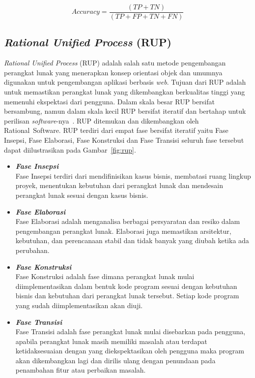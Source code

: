 \begin{itemize}
      \begin{equation}\label{eq:Accuracy}
            Accuracy = \frac{(TP + TN)}{(TP + FP + TN + FN)}
      \end{equation}

\end{itemize}

\subsection{\emph{Rational Unified Process} (RUP)}
\emph{Rational Unified Process} (RUP) adalah salah satu metode pengembangan perangkat lunak yang
menerapkan konsep orientasi objek dan umumnya digunakan untuk pengembangan aplikasi
berbasis \emph{web}. Tujuan dari RUP adalah untuk memastikan perangkat lunak yang dikembangkan
berkualitas tinggi yang memenuhi ekspektasi dari pengguna. Dalam skala besar RUP bersifat bersambung,
namun dalam skala kecil RUP bersifat iteratif dan bertahap untuk perilisan
\emph{software}-nya~\citep{anwar2014review}. RUP ditemukan dan dikembangkan oleh
Rational\textregistered~Software. RUP terdiri dari empat fase bersifat iteratif yaitu Fase Insepsi,
Fase Elaborasi, Fase Konstruksi dan Fase Transisi seluruh fase tersebut dapat diilustrasikan pada Gambar~\ref{fig:rup}.

\begin{itemize}
      \item \emph{\bfseries Fase Insepsi}\\ 
      Fase Insepsi terdiri dari mendifinisikan kasus bisnis,
      membatasi ruang lingkup proyek, menentukan kebutuhan dari perangkat lunak dan mendesain perangkat
      lunak sesuai dengan kasus bisnis.

      \item \emph{\bfseries Fase Elaborasi}\\
      Fase Elaborasi adalah menganalisa berbagai persyaratan dan resiko dalam pengembangan perangkat
      lunak. Elaborasi juga memastikan arsitektur, kebutuhan, dan perencanaan stabil dan tidak banyak
      yang diubah ketika ada perubahan.

      \item \emph{\bfseries Fase Konstruksi}\\
      Fase Konstruksi adalah fase dimana perangkat lunak mulai
      diimplementasikan dalam bentuk kode program sesuai dengan kebutuhan bisnis dan kebutuhan dari
      perangkat lunak tersebut. Setiap kode program yang sudah diimplementasikan akan diuji.

      \item \emph{\bfseries Fase Transisi}\\
      Fase Transisi adalah fase perangkat lunak mulai disebarkan pada pengguna, apabila perangkat
      lunak masih memiliki masalah atau terdapat ketidaksesuaian dengan yang diekspektasikan oleh
      pengguna maka program akan dikembangkan lagi dan dirilis ulang dengan penundaan pada penambahan
      fitur atau perbaikan masalah.

\end{itemize}

